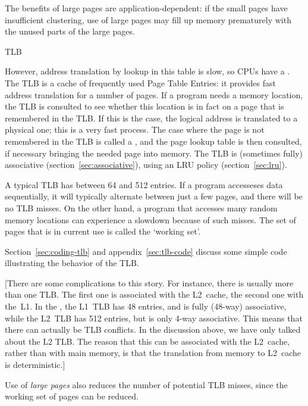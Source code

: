 The benefits of large pages are application-dependent: if the small
pages have insufficient clustering, use of large pages may fill up
memory prematurely with the unused parts of the large pages.

 {TLB}
\label{sec:tlb}

However, address translation by lookup in this table is slow, so \acp{CPU}
have a .
The \ac{TLB} is a cache of frequently used 
Page Table Entries: it provides fast address translation for a number
of pages. If a program needs a memory
location, the \ac{TLB} is consulted to see whether this location is in fact
on a page that is remembered in the \ac{TLB}. 
If this is the case, the logical address is
translated to a physical one; this is a very fast process.
The case
where the page is not remembered in the \ac{TLB} is called a
, and the page lookup table is then consulted,
if necessary bringing the needed page into memory.
The \ac{TLB} is (sometimes fully) associative
(section~\ref{sec:associative}), using an LRU policy
(section~\ref{sec:lru}).

A typical \ac{TLB} has between 64 and 512 entries.
If a program accesseses
data sequentially, it will typically alternate between just a few
pages, and there will be no \ac{TLB} misses.
On the other hand, a program
that accesses many random memory locations can experience a slowdown
because of such misses. The set of pages that is in current use is
called the `working set'.

Section~\ref{sec:coding-tlb} and appendix~\ref{sec:tlb-code} discuss
some simple code illustrating the
behavior of the \ac{TLB}.

[There are some complications to this story. For instance, there is
  usually more than one \ac{TLB}. The first one is associated with the
  L2~cache, the second one with the~L1. In the
  , the L1~\ac{TLB} has 48 entries, and
  is fully (48-way) associative, while the L2~\ac{TLB} has 512
  entries, but is only 4-way associative. This means that there can
  actually be \ac{TLB} conflicts. In the discussion above, we have
  only talked about the L2 \ac{TLB}. The reason that this can be
  associated with the L2~cache, rather than with main memory, is that
  the translation from memory to L2~cache is deterministic.]

Use of \emph{large pages} also reduces the
number of potential TLB misses, since the working set of pages can be
reduced.

